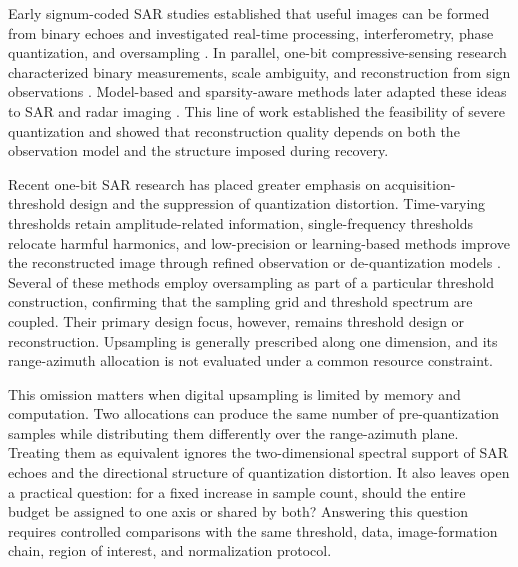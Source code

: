 \documentclass[conference]{IEEEtran}
\begin{document}
Early signum-coded SAR studies established that useful images can be formed from binary echoes and investigated real-time processing, interferometry, phase quantization, and oversampling \cite{franceschetti1991signum,alberti1991time,cappuccino1996processor,fornaro1997interferometry,pascazio1998onebit,franceschetti1999phase}. In parallel, one-bit compressive-sensing research characterized binary measurements, scale ambiguity, and reconstruction from sign observations \cite{candes2008intro,boufounos2008onebit,laska2011trust,jacques2013robust}. Model-based and sparsity-aware methods later adapted these ideas to SAR and radar imaging \cite{dong2015map,wang2019enhanced,ge2023sparse}. This line of work established the feasibility of severe quantization and showed that reconstruction quality depends on both the observation model and the structure imposed during recovery.

Recent one-bit SAR research has placed greater emphasis on acquisition-threshold design and the suppression of quantization distortion. Time-varying thresholds retain amplitude-related information, single-frequency thresholds relocate harmful harmonics, and low-precision or learning-based methods improve the reconstructed image through refined observation or de-quantization models \cite{demir2018onebit,zhao2019onebit,zhao2021lowprecision,liu2023twobit,si2023dequantization,nie2025fixed}. Several of these methods employ oversampling as part of a particular threshold construction, confirming that the sampling grid and threshold spectrum are coupled. Their primary design focus, however, remains threshold design or reconstruction. Upsampling is generally prescribed along one dimension, and its range-azimuth allocation is not evaluated under a common resource constraint.

This omission matters when digital upsampling is limited by memory and computation. Two allocations can produce the same number of pre-quantization samples while distributing them differently over the range-azimuth plane. Treating them as equivalent ignores the two-dimensional spectral support of SAR echoes and the directional structure of quantization distortion. It also leaves open a practical question: for a fixed increase in sample count, should the entire budget be assigned to one axis or shared by both? Answering this question requires controlled comparisons with the same threshold, data, image-formation chain, region of interest, and normalization protocol.
\end{document}
